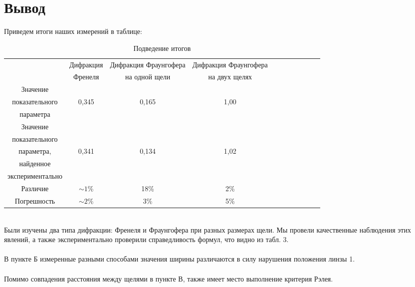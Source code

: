 \documentclass[12pt]{article}
\begin{document}
\section{Вывод}
Приведем итоги наших измерений в таблице:
\begin{table}[h!]
	\begin{center}

	\begin{tabular}{||c|c|c|c|c||c||c||l|l||l|l|}
		
		\hline
		 & Дифракция  & Дифракция Фраунгофера & Дифракция Фраунгофера\\
		 & Френеля & на одной щели &  на двух щелях\\
		\hline
		Значение &  &  &   \\
		показательного & 0,345 & 0,165 & 1,00  \\
		параметра &  &  &  \\
		\hline
		Значение &  &  &  \\
		показательного & & & \\
		параметра, & 0,341 & 0,134 & 1,02 \\
		найденное &  &  &  \\
		экспериментально & &  & \\
		\hline
		Различие & $\sim 1$\% & 18\% & 2\% \\
		\hline
		Погрешность & $\sim 2$\% & 3\% & 5\% \\
		\hline
	\end{tabular}
	\caption{Подведение итогов}
		\end{center}
\end{table}
\\
Были изучены два типа дифракции: Френеля и Фраунгофера при разных размерах щели. Мы провели качественные наблюдения этих явлений, а также экспериментально проверили справедливость формул, что видно из табл. 3.\\
\\
В пункте Б измеренные разными способами значения ширины различаются в силу нарушения положения линзы 1.\\
\\
Помимо совпадения расстояния между щелями в пункте В, также имеет место выполнение критерия Рэлея.

 
\end{document}
